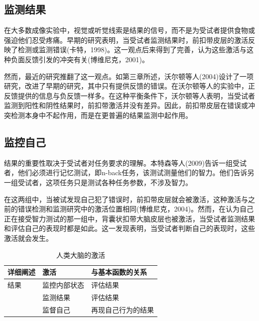 \subsection{监测结果}
\par
在大多数成像实验中，视觉或听觉线索是结果的信号，而不是为受试者提供食物或强迫他们忍受疼痛。早期的研究表明，当受试者监测结果时，前扣带皮层的激活反映了检测或监测错误(卡特，1998)。这一观点后来得到了完善，认为这些激活与这种负面反馈引发的冲突有关(博维尼克，2001)。
\par
然而，最近的研究推翻了这一观点。如第三章所述，沃尔顿等人(2004)设计了一项研究，改进了早期的研究，其中只有提供反馈的错误。在沃尔顿等人的实验中，正反馈提供的信息与负反馈一样多。在这种平衡条件下，沃尔顿等人表明，当受试者监测到阳性和阴性结果时，前扣带激活并没有差异。因此，前扣带皮层在错误或冲突检测本身中不起作用，而是在更普遍的结果监测中起作用。
\par
\subsection{监控自己}
\par
结果的重要性取决于受试者对任务要求的理解。本特森等人(2009)告诉一组受试者，他们必须进行记忆测试，即n-back任务，该测试测量他们的智力。他们告诉另一组受试者，这项任务只是测试各种任务参数，不涉及智力。
\par
在这两组中，当被试发现自己犯了错误时，前扣带皮层就会被激活，这种激活与之前的错误检测和监测研究中的激活位置相同(博维尼克，2004)。然而，在认为自己正在接受智力测试的那一组中，背囊状扣带大脑皮层也被激活，当受试者监测结果和评估自己的表现时都是如此。这一发现表明，当受试者判断自己的表现时，这些激活就会发生。
\par

\begin{table}[htbp] 
	\newcommand{\tabincell}[2]{\begin{tabular}{@{}#1@{}}#2\end{tabular}} %
	\centering
	\caption{人类大脑的激活\label{tab:9_5}}
	\renewcommand\arraystretch{1.5}	%
	\begin{tabular}{lll}
		\toprule
		详细阐述 & 激活 & 与基本函数的关系\\
		\midrule
		结果 & 监控内部状态 & 评估结果  \\
		& 监测结果 & 评估结果 \\
		& 监督自己 & 再现自己行为的结果 \\
		\bottomrule
		
	\end{tabular}%
\end{table}%


